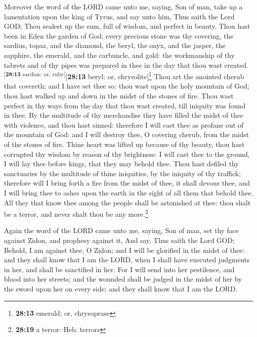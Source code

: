  Moreover the word of the LORD came unto me, saying,
 Son of man, take up a lamentation upon the king of
Tyrus, and say unto him, Thus saith the Lord GOD; Thou sealest up the
sum, full of wisdom, and perfect in beauty.  Thou hast
been in Eden the garden of God; every precious stone was thy covering,
the sardius, topaz, and the diamond, the beryl, the onyx, and the
jasper, the sapphire, the emerald, and the carbuncle, and gold: the
workmanship of thy tabrets and of thy pipes was prepared in thee in the
day that thou wast created.\textsuperscript{{[}\textbf{28:13} sardius:
or, ruby{]}}{[}\textbf{28:13} beryl: or, chrysolite{]}\footnote{\textbf{28:13}
  emerald: or, chrysoprase}  Thou art the anointed cherub
that covereth; and I have set thee so: thou wast upon the holy mountain
of God; thou hast walked up and down in the midst of the stones of fire.
 Thou wast perfect in thy ways from the day that thou
wast created, till iniquity was found in thee.  By the
multitude of thy merchandise they have filled the midst of thee with
violence, and thou hast sinned: therefore I will cast thee as profane
out of the mountain of God: and I will destroy thee, O covering cherub,
from the midst of the stones of fire.  Thine heart was
lifted up because of thy beauty, thou hast corrupted thy wisdom by
reason of thy brightness: I will cast thee to the ground, I will lay
thee before kings, that they may behold thee.  Thou hast
defiled thy sanctuaries by the multitude of thine iniquities, by the
iniquity of thy traffick; therefore will I bring forth a fire from the
midst of thee, it shall devour thee, and I will bring thee to ashes upon
the earth in the sight of all them that behold thee.  All
they that know thee among the people shall be astonished at thee: thou
shalt be a terror, and never shalt thou be any more.\footnote{\textbf{28:19}
  a terror: Heb. terrors}

 Again the word of the LORD came unto me, saying,
 Son of man, set thy face against Zidon, and prophesy
against it,  And say, Thus saith the Lord GOD; Behold, I
am against thee, O Zidon; and I will be glorified in the midst of thee:
and they shall know that I am the LORD, when I shall have executed
judgments in her, and shall be sanctified in her.  For I
will send into her pestilence, and blood into her streets; and the
wounded shall be judged in the midst of her by the sword upon her on
every side; and they shall know that I am the LORD.

